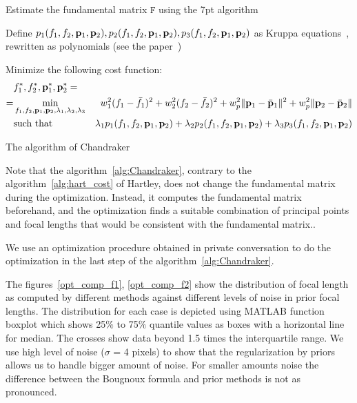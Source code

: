 \begin{algorithm}[H]
\SetAlgoLined 
\LinesNotNumbered
 \Begin
    {Estimate the fundamental matrix $\mathtt{F}$ using the 7pt algorithm\;
    
    Define $p_1(f_1, f_2, \mathbf{p}_1,\mathbf{p}_2), p_2(f_1, f_2, \mathbf{p}_1,\mathbf{p}_2), p_3(f_1, f_2, \mathbf{p}_1,\mathbf{p}_2)$ as Kruppa equations~\cite{HartZiss}, rewritten as polynomials (see the paper~\cite{Chandraker})\;
    
    Minimize the following cost function:
    \begin{align*}
    & f_1^*, f_2^*, \mathbf{p}_1^*,\mathbf{p}_2^* = & \\ = & \min_{f_1, f_2, \mathbf{p}_1, \mathbf{p}_2, \lambda_1, \lambda_2, \lambda_3} & w_1^2 (f_1 - \bar{f}_1)^2 + w_2^2 (f_2 - \bar{f}_2)^2  + w_p^2 \lVert\mathbf{p}_1-\bar{\mathbf{p}}_1\rVert^2 + w_p^2 \lVert\mathbf{p}_2-\bar{\mathbf{p}}_2\rVert \\ & \text{such that } & \lambda_1 p_1(f_1, f_2, \mathbf{p}_1,\mathbf{p}_2)+ \lambda_2 p_2(f_1, f_2, \mathbf{p}_1,\mathbf{p}_2) + \lambda_3 p_3(f_1, f_2, \mathbf{p}_1,\mathbf{p}_2)
    \end{align*}

    }
 \caption{The algorithm of Chandraker~\cite{Chandraker}}
 \label{alg:Chandraker}
\end{algorithm}

Note that the algorithm~\ref{alg:Chandraker}, contrary to the algorithm~\ref{alg:hart_cost} of Hartley, does not  change the fundamental matrix during the optimization. Instead, it computes the fundamental matrix beforehand, and the optimization finds a suitable combination of principal points and focal lengths that would be consistent with the fundamental matrix..

We use an optimization procedure obtained in private conversation to do the optimization in the last step of the algorithm~\ref{alg:Chandraker}.

The figures~\ref{opt_comp_f1}, \ref{opt_comp_f2} show the distribution of focal length as computed by different methods against different levels of noise in prior focal lengths. The distribution for each case is depicted using MATLAB function boxplot which shows 25$\%$ to 75$\%$ quantile values as boxes with a horizontal line for median. The crosses show data beyond 1.5 times the interquartile range. We use high level of noise ($\sigma$ = 4 pixels) to show that the regularization by priors allows us to handle bigger amount of noise. For smaller amounts noise  the difference between the Bougnoux formula and prior methods is not as pronounced.

